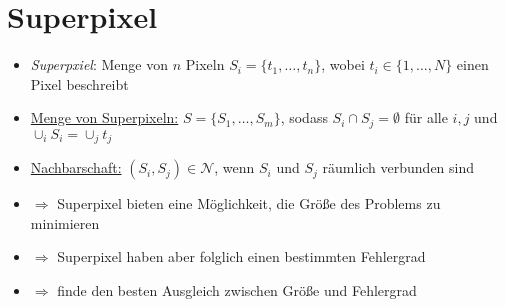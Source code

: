 \section{Superpixel}

\begin{itemize}
  \item \emph{Superpxiel}: Menge von $n$ Pixeln $S_i = \lbrace t_1, \ldots, t_n \rbrace$, wobei $t_i \in \lbrace 1, \ldots, N \rbrace$ einen Pixel beschreibt
  \item \underline{Menge von Superpixeln:} $S = \lbrace S_1, \ldots, S_m \rbrace$, sodass $S_i \cap S_j = \emptyset$ für alle $i, j$ und $\cup_i S_i = \cup_j t_j$
  \item \underline{Nachbarschaft:} $(S_i, S_j) \in \mathcal{N}$, wenn $S_i$ und $S_j$ räumlich verbunden sind
  \item $\Rightarrow$ Superpixel bieten eine Möglichkeit, die Größe des Problems zu minimieren
  \item $\Rightarrow$ Superpixel haben aber folglich einen bestimmten Fehlergrad
  \item $\Rightarrow$ finde den besten Ausgleich zwischen Größe und Fehlergrad
\end{itemize}
